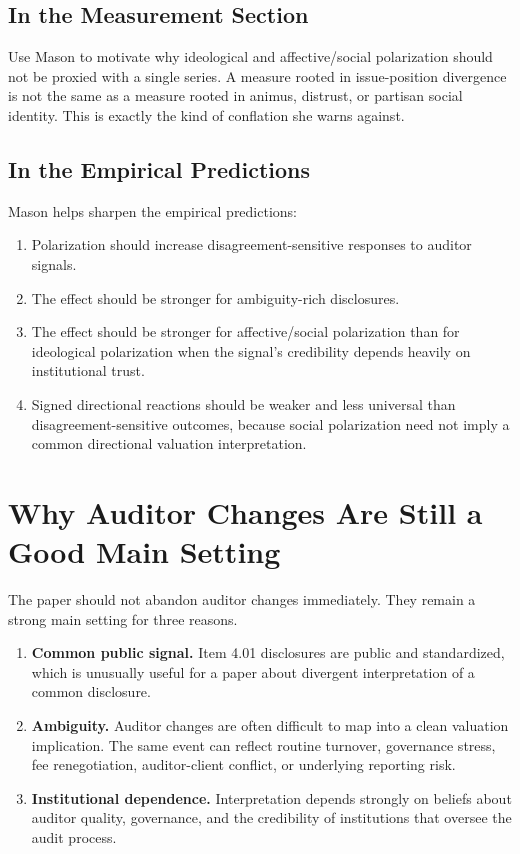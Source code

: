 \documentclass[12pt]{article}
\begin{document}
\subsection{In the Measurement Section}

Use Mason to motivate why ideological and affective/social polarization should not be proxied with a single series. A measure rooted in issue-position divergence is not the same as a measure rooted in animus, distrust, or partisan social identity. This is exactly the kind of conflation she warns against.

\subsection{In the Empirical Predictions}

Mason helps sharpen the empirical predictions:

\begin{enumerate}[label=\textbf{H\arabic*.}]
    \item Polarization should increase disagreement-sensitive responses to auditor signals.
    \item The effect should be stronger for ambiguity-rich disclosures.
    \item The effect should be stronger for affective/social polarization than for ideological polarization when the signal's credibility depends heavily on institutional trust.
    \item Signed directional reactions should be weaker and less universal than disagreement-sensitive outcomes, because social polarization need not imply a common directional valuation interpretation.
\end{enumerate}

\section{Why Auditor Changes Are Still a Good Main Setting}

The paper should not abandon auditor changes immediately. They remain a strong main setting for three reasons.

\begin{enumerate}[label=\textbf{A\arabic*.}]
    \item \textbf{Common public signal.} Item 4.01 disclosures are public and standardized, which is unusually useful for a paper about divergent interpretation of a common disclosure.
    \item \textbf{Ambiguity.} Auditor changes are often difficult to map into a clean valuation implication. The same event can reflect routine turnover, governance stress, fee renegotiation, auditor-client conflict, or underlying reporting risk.
    \item \textbf{Institutional dependence.} Interpretation depends strongly on beliefs about auditor quality, governance, and the credibility of institutions that oversee the audit process.
\end{enumerate}
\end{document}
